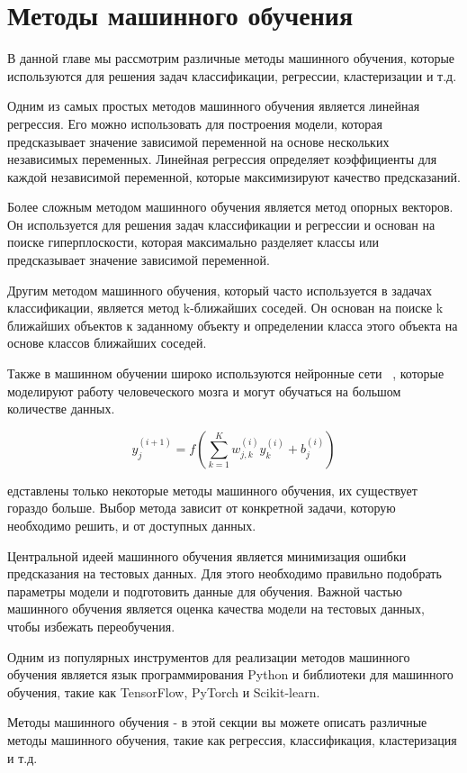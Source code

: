 
\section{Методы машинного обучения}\label{sec:machine_learning_techniques.tex}

        В данной главе мы рассмотрим различные методы машинного обучения, которые используются для решения задач классификации, регрессии, кластеризации и т.д.

    Одним из самых простых методов машинного обучения является линейная регрессия. Его можно использовать для построения модели, которая предсказывает значение зависимой переменной на основе нескольких независимых переменных. Линейная регрессия определяет коэффициенты для каждой независимой переменной, которые максимизируют качество предсказаний.

    Более сложным методом машинного обучения является метод опорных векторов. Он используется для решения задач классификации и регрессии и основан на поиске гиперплоскости, которая максимально разделяет классы или предсказывает значение зависимой переменной.

    Другим методом машинного обучения, который часто используется в задачах классификации, является метод k-ближайших соседей. Он основан на поиске k ближайших объектов к заданному объекту и определении класса этого объекта на основе классов ближайших соседей.

    Также в машинном обучении широко используются нейронные сети ~\cite{Goodfellow-et-al-2016}, которые моделируют работу человеческого мозга и могут обучаться на большом количестве данных.

        $$
        y_j^{(i+1)} = f\left(\sum_{k=1}^{K} w_{j,k}^{(i)} y_k^{(i)} + b_j^{(i)}\right)
        $$


    едставлены только некоторые методы машинного обучения, их существует гораздо больше. Выбор метода зависит от конкретной задачи, которую необходимо решить, и от доступных данных.

    Центральной идеей машинного обучения является минимизация ошибки предсказания на тестовых данных. Для этого необходимо правильно подобрать параметры модели и подготовить данные для обучения. Важной частью машинного обучения является оценка качества модели на тестовых данных, чтобы избежать переобучения.

    Одним из популярных инструментов для реализации методов машинного обучения является язык программирования Python и библиотеки для машинного обучения, такие как TensorFlow, PyTorch и Scikit-learn.

    Методы машинного обучения - в этой секции вы можете описать различные методы машинного обучения, такие как регрессия, классификация, кластеризация и т.д.

